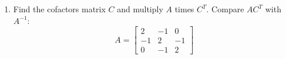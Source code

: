 \begin{enumerate}[label=\arabic*.]
    \item Find the cofactors matrix $C$ and multiply $A$ times $C^{T}$.
        Compare $AC^{T}$ with $A^{-1}$:
        \begin{equation}
            A =
            \begin{bmatrix}
                2 & -1 & 0 \\
                -1 & 2 & -1 \\
                0 & -1 & 2
             \end{bmatrix}
        \end{equation}
\end{enumerate}
